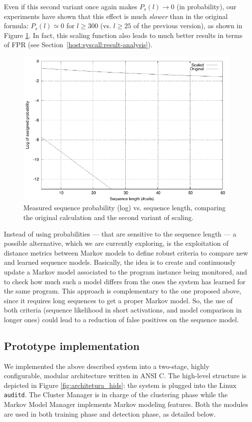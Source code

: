 \begin{note}
Even if this second variant once again makes $P_{s}(l) \to 0$ (in probability), our experiments have shown that this effect is much \emph{slower} than in the original formula: $P_{s}(l) \simeq 0$ for $l \geq 300$ (vs. $l \geq 25$ of the previous version), as shown in Figure \ref{fig:normalization}. In fact, this scaling function also leads to much better results in terms of \ac{FPR} (see Section~\ref{host:syscall:result-analysis}).  
\end{note}

\begin{figure}[t]
  \centering
  \includegraphics[width=.8\textwidth]{figures/host/syscall/normalization}
  \caption{Measured sequence probability (log) vs. sequence length, comparing the original calculation and the second variant of scaling.}
  \label{fig:normalization}
\end{figure}

Instead of using probabilities --- that are sensitive to the sequence length --- a possible alternative, which we are currently exploring, is the exploitation of distance metrics between Markov models \citep{stolcke93hidden,stolcke:icsi1994:merging,InducingProbabilisticGrammarsMerging} to define robust criteria to compare new and learned sequence models. Basically, the idea is to create and continuously update a Markov model associated to the program instance being monitored, and to check how much such a model differs from the ones the system has learned for the same program. This approach is complementary to the one proposed above, since it requires long sequences to get a proper Markov model. So, the use of both criteria (sequence likelihood in short activations, and model comparison in longer ones) could lead to a reduction of false positives on the sequence model.

\subsection{Prototype implementation}
\label{host:syscall:prot-impl}
We implemented the above described system into a two-stage, highly configurable, modular architecture written in \ac{ANSI} C. The high-level structure is depicted in Figure \ref{fig:architetura_hids}: the system is plugged into the Linux \texttt{auditd}. The Cluster Manager is in charge of the clustering phase while the Markov Model Manager implements Markov modeling features. Both the modules are used in both training phase and detection phase, as detailed below.

